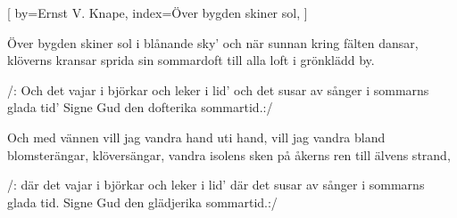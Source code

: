 

[
by={Ernst V. Knape},
index={Över bygden skiner sol},
]

\beginverse*
Över bygden skiner sol i blånande sky'
och när sunnan kring fälten dansar,
klöverns kransar
sprida sin sommardoft
till alla loft
i grönklädd by.
\endverse

\beginchorus
/: Och det vajar i björkar och leker i lid'
och det susar av sånger i sommarns glada tid'
Signe Gud den dofterika sommartid.:/
\endchorus							%

\beginverse* 
Och med vännen vill jag vandra hand uti hand,
vill jag vandra bland blomsterängar,
klöversängar,
vandra isolens sken
på åkerns ren
till älvens strand,
\endverse

\beginchorus
/: där det vajar i björkar och leker i lid'
där det susar av sånger i sommarns glada tid.
Signe Gud den glädjerika sommartid.:/
\endchorus	
\endsong


